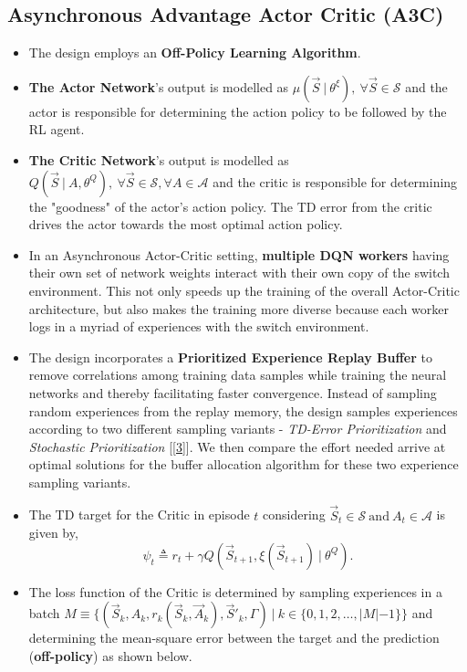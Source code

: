 \documentclass{article}
\begin{document}
\subsection{Asynchronous Advantage Actor Critic (A3C)}
\begin{itemize}
    \item The design employs an \textbf{Off-Policy Learning Algorithm}.
    \item \textbf{The Actor Network}'s output is modelled as $\mu(\vec{S}\ |\ \theta^{\xi}),\ \forall \vec{S} \in \mathcal{S}$ and the actor is responsible for determining the action policy to be followed by the RL agent.
    \item \textbf{The Critic Network}'s output is modelled as $Q(\vec{S}\ |\ A, \theta^{Q}),\ \forall \vec{S} \in \mathcal{S}, \forall A \in \mathcal{A}$ and the critic is responsible for determining the "goodness" of the actor's action policy. The TD error from the critic drives the actor towards the most optimal action policy.
    \item In an Asynchronous Actor-Critic setting, \textbf{multiple DQN workers} having their own set of network weights interact with their own copy of the switch environment. This not only speeds up the training of the overall Actor-Critic architecture, but also makes the training more diverse because each worker logs in a myriad of experiences with the switch environment.
    \item The design incorporates a \textbf{Prioritized Experience Replay Buffer} to remove correlations among training data samples while training the neural networks and thereby facilitating faster convergence. Instead of sampling random experiences from the replay memory, the design samples experiences according to two different sampling variants - \textit{TD-Error Prioritization} and \textit{Stochastic Prioritization} [\ref{3}]. We then compare the effort needed arrive at optimal solutions for the buffer allocation algorithm for these two experience sampling variants.
    \item The TD target for the Critic in episode $t$ considering $\vec{S}_t \in \mathcal{S}\ \text{and}\ A_t \in \mathcal{A}$ is given by,
    \begin{equation}
        \psi_{t} \triangleq r_t + \gamma Q(\vec{S}_{t+1}, \xi(\vec{S}_{t+1})\ |\ \theta^{Q}).
    \end{equation}
    \item The loss function of the Critic is determined by sampling experiences in a batch $M \equiv \{(\vec{S}_{k}, A_{k}, r_{k}(\vec{S}_{k}, \vec{A}_{k}), \vec{S}'_{k}, \Gamma)\ |\ k \in \{0, 1, 2, \dots, |M| - 1\}\}$ and determining the mean-square error between the target and the prediction (\textbf{off-policy}) as shown below.

\end{itemize}
\end{document}
